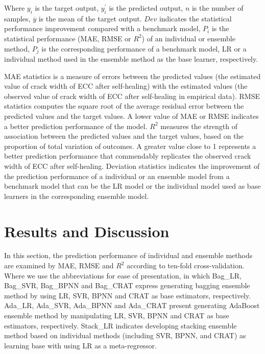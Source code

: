 \documentclass[11pt]{article}
\begin{document}
	Where $y_i$ is the target output, $y_i^{'}$ is the predicted output, $n$ is the number of samples, $\overline{y}$ is the mean of the target output. $Dev$ indicates the statistical performance improvement compared with a benchmark model, $P_i$ is the statistical performance (MAE, RMSE or  $R^2$) of an individual or ensemble method, $P_j$ is the corresponding performance of a benchmark model, LR or a individual method used in the ensemble method as the base learner, respectively.
	
	MAE statistics is a measure of errors between the predicted values (the estimated value of crack width of ECC after self-healing) with the estimated  values (the observed value of crack width of ECC after self-healing in empirical data). RMSE statistics computes the square root of the average residual error between the predicted values and the target values. A lower value of MAE or RMSE indicates a better prediction performance of the model. $R^2$ measures the strength of association between the predicted values and the target values, based on the proportion of total variation of outcomes. A greater value close to 1 represents a better prediction performance that commendably replicates the observed crack width of ECC after self-healing.  Deviation statistics indicates the improvement of the prediction performance of a individual or an ensemble model from a benchmark model that can be the LR model or the individual model used as base learners in the corresponding ensemble model. 
	
	
	
	
	\section{Results and Discussion}
	\label{result}
	
	In this section, the prediction performance of individual and ensemble methods are examined by MAE, RMSE and $R^2$ according to ten-fold cross-validation. Where we use the abbreviations for ease of presentation, in which Bag\_LR, Bag\_SVR, Bag\_BPNN and Bag\_CRAT express generating bagging ensemble method by using LR, SVR, BPNN and CRAT as base estimators, respectively. Ada\_LR, Ada\_SVR, Ada\_BPNN and Ada\_CRAT present generating AdaBoost ensemble method by manipulating LR, SVR, BPNN and CRAT as base estimators, respectively. Stack\_LR indicates developing stacking ensemble method based on individual methods (including SVR, BPNN, and CRAT) as learning base with using LR as a meta-regressor. 
	
\end{document}
